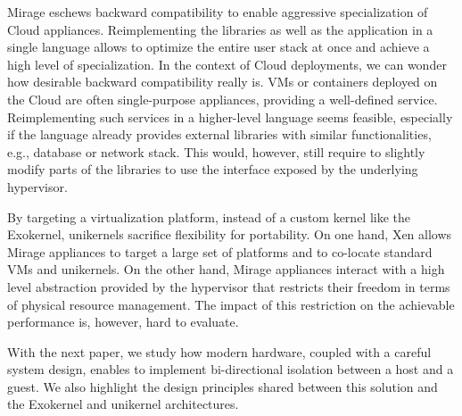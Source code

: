 Mirage eschews backward compatibility to enable aggressive specialization of Cloud appliances.
Reimplementing the libraries as well as the application in a single language allows to optimize the entire user stack at once and achieve a high level of specialization.
In the context of Cloud deployments, we can wonder how desirable backward compatibility really is.
VMs or containers deployed on the Cloud are often single-purpose appliances, providing a well-defined service.
Reimplementing such services in a higher-level language seems feasible, especially if the language already provides external libraries with similar functionalities, e.g., database or network stack.
This would, however, still require to slightly modify parts of the libraries to use the interface exposed by the underlying hypervisor.

By targeting a virtualization platform, instead of a custom kernel like the Exokernel, unikernels sacrifice flexibility for portability.
On one hand, Xen allows Mirage appliances to target a large set of platforms and to co-locate standard VMs and unikernels.
On the other hand, Mirage appliances interact with a high level abstraction provided by the hypervisor that restricts their freedom in terms of physical resource management.
The impact of this restriction on the achievable performance is, however, hard to evaluate.

With the next paper, we study how modern hardware, coupled with a careful system design, enables to implement bi-directional isolation between a host and a guest.
We also highlight the design principles shared between this solution and the Exokernel and unikernel architectures.


